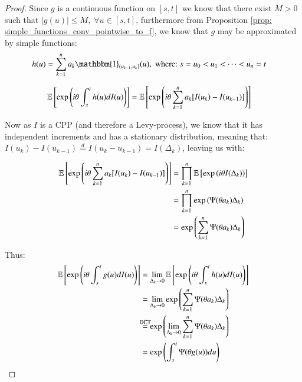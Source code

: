 \begin{proof}
Since $g$ is a continuous function on $[s,t]$ we know that there exist $M>0$ such that $|g(u)| \leq M,\; \forall u \in [s,t]$, furthermore from Proposition \ref{prop: simple_functions_conv_pointwise_to_f}, we know that $g$ may be approximated by simple functions: 
\begin{align*}
h(u) &= \sum_{k=1}^{n}a_{k}\mathbbm{1}_{(u_{k-1}, u_{k}]}(u), \;\text{where:}\; s = u_{0} < u_{1} < \dots < u_{n} = t  
\end{align*}

\begin{align*}
\mathbb{E}\left[
\exp\left(
i\theta \int_{s}^{t}h(u)dI(u)
\right)
\right]
&= 
\mathbb{E}\left[
\exp\left(
i\theta \sum_{k=1}^{n}a_{k}[I(u_{k}) - I(u_{k-1})]
\right)
\right]
\end{align*}

Now as $I$ is a CPP (and therefore a Levy-process), we know that it has independent increments and has a stationary distribution, meaning that: 
$I(u_{k}) - I(u_{k-1}) \stackrel{d}{=} I(u_{k}-u_{k-1}) = I(\Delta_{k})$, leaving us with: 

\newpage 

\begin{align*}
\mathbb{E}\left[
\exp\left(
i\theta \sum_{k=1}^{n}a_{k}[I(u_{k}) - I(u_{k-1})]
\right)
\right] 
&= 
\prod_{k=1}^{n}\mathbb{E}\left[
\exp\left(
i\theta I(\Delta_{k})
\right)
\right] \\ 
&= 
\prod_{k=1}^{n}\exp\left(
\Psi(\theta a_{k})\Delta_{k}
\right) \\ 
&= 
\exp\left(
\sum_{k=1}^{n}\Psi(\theta a_{k})\Delta_{k}
\right)
\end{align*}

Thus: 
\begin{align*}
\E\left[
\exp\left(
i\theta\int_{s}^{t}g(u)dI(u)
\right)
\right]
&= 
\lim\limits_{\Delta_{k}\to 0}\E\left[
\exp\left(
i\theta\int_{s}^{t}h(u)dI(u)
\right)
\right] \\ 
&= 
\lim\limits_{\Delta_{k}\to 0}
\exp\left(
\sum_{k=1}^{n}\Psi(\theta a_{k})\Delta_{k}
\right) \\ 
&\stackrel{\mathclap{\mathrm{DCT}}}{=} 
\exp\left(
\lim\limits_{\Delta_{k}\to 0}
\sum_{k=1}^{n}\Psi(\theta a_{k})\Delta_{k}
\right) \\ 
&= 
\exp\left(
\int_{s}^{t}\Psi(\theta g(u))du
\right)
\end{align*}

\end{proof}


